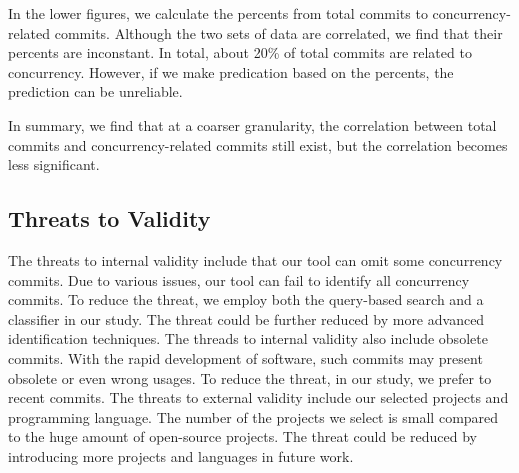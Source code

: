 In the lower figures, we calculate the percents from total commits to concurrency-related commits. Although the two sets of data are correlated, we find that their percents are inconstant. In total, about 20\% of total commits are related to concurrency. However, if we make predication based on the percents, the prediction can be unreliable.

In summary, we find that at a coarser granularity, the correlation between total commits and concurrency-related commits still exist, but the correlation becomes less significant.






\subsection{Threats to Validity}

The threats to internal validity include that our tool can omit some concurrency commits. Due to various issues, our tool can fail to identify all concurrency commits. To reduce the threat, we employ both the query-based search and a classifier in our study. The threat could be further reduced by more advanced identification techniques. The threads to internal validity also include obsolete commits. With the rapid development of software, such commits may present obsolete or even wrong usages. To reduce the threat, in our study, we prefer to recent commits. The threats to external validity include our selected projects and programming language. The number of the projects we select is small compared to the huge amount of open-source projects. The threat could be reduced by introducing more projects and languages in future work.

